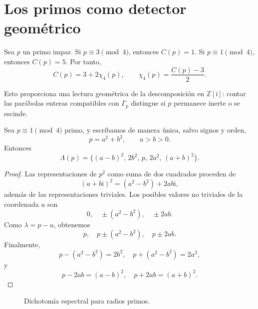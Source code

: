\documentclass[11pt,a4paper,openany]{report}
\newcommand{\Z}{\mathbb{Z}}
\newcommand{\Lam}{\Lambda}
\newcommand{\ii}{\mathrm{i}}
\begin{document}
\section{Los primos como detector geométrico}

Sea \(p\) un primo impar. Si \(p\equiv3\pmod4\), entonces \(C(p)=1\). Si \(p\equiv1\pmod4\), entonces \(C(p)=5\). Por tanto,
\begin{equation}
 \boxed{C(p)=3+2\chi_4(p),}
 \qquad
 \boxed{\chi_4(p)=\frac{C(p)-3}{2}.}
 \label{eq:prime-detector}
\end{equation}

Esto proporciona una lectura geométrica de la descomposición en \(\Z[\ii]\): contar las parábolas enteras compatibles con \(\Gamma_p\) distingue si \(p\) permanece inerte o se escinde.

\begin{theorem}
Sea \(p\equiv1\pmod4\) primo, y escribamos de manera única, salvo signos y orden,
\[
 p=a^2+b^2,
 \qquad a>b>0.
\]
Entonces
\begin{equation}
 \boxed{
 \Lam(p)=\{(a-b)^2,\,2b^2,\,p,\,2a^2,\,(a+b)^2\}.}
 \label{eq:split-prime-spectrum}
\end{equation}
\end{theorem}

\begin{proof}
Las representaciones de \(p^2\) como suma de dos cuadrados proceden de
\[
 (a+b\ii)^2=(a^2-b^2)+2ab\ii,
\]
además de las representaciones triviales. Los posibles valores no triviales de la coordenada \(u\) son
\[
 0,\quad \pm(a^2-b^2),\quad \pm2ab.
\]
Como \(\lambda=p-u\), obtenemos
\[
 p,\quad p\pm(a^2-b^2),\quad p\pm2ab.
\]
Finalmente,
\[
 p-(a^2-b^2)=2b^2,
 \quad p+(a^2-b^2)=2a^2,
\]
y
\[
 p-2ab=(a-b)^2,
 \quad p+2ab=(a+b)^2.
\]
\end{proof}

\begin{figure}[H]
\centering
{}
\caption{Dichotomía espectral para radios primos.}
\label{fig:prime-dichotomy}
\end{figure}
\end{document}

